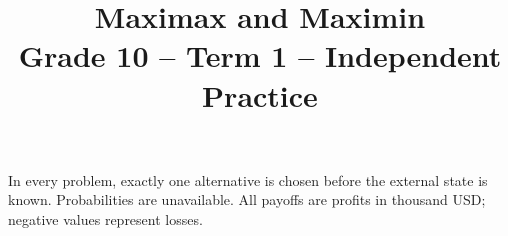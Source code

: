 \makeatletter
{}
\makeatother



\title{\vspace{-15mm}Maximax and Maximin\\[3pt]\large Grade 10 -- Term 1 -- Independent Practice}
\author{}
\date{}
\pagestyle{plain}


\maketitle
\vspace{-18mm}

In every problem, exactly one alternative is chosen before the external state is known.
Probabilities are unavailable. All payoffs are profits in thousand USD; negative values represent losses.

